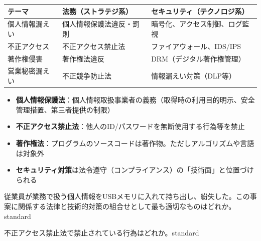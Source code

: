 \begin{comparison}
\begin{tabularx}{\textwidth}{lXX}
  \toprule
  \textbf{テーマ} & \textbf{法務（ストラテジ系）} & \textbf{セキュリティ（テクノロジ系）} \\
  \midrule
  個人情報漏えい & 個人情報保護法違反・罰則 & 暗号化、アクセス制御、ログ監視 \\
  不正アクセス & 不正アクセス禁止法 & ファイアウォール、IDS/IPS \\
  著作権侵害 & 著作権法違反 & DRM（デジタル著作権管理） \\
  営業秘密漏えい & 不正競争防止法 & 情報漏えい対策（DLP等） \\
  \bottomrule
\end{tabularx}
\end{comparison}

\begin{keypoint}
\begin{itemize}
  \item \textbf{個人情報保護法}：個人情報取扱事業者の義務（取得時の利用目的明示、安全管理措置、第三者提供の制限）
  \item \textbf{不正アクセス禁止法}：他人のID/パスワードを無断使用する行為等を禁止
  \item \textbf{著作権法}：プログラムのソースコードは著作物。ただしアルゴリズムや言語は対象外
  \item \textbf{セキュリティ対策}は法令遵守（コンプライアンス）の「技術面」と位置づけられる
\end{itemize}
\end{keypoint}


\begin{mondai}{従業員が業務で扱う個人情報をUSBメモリに入れて持ち出し、紛失した。この事案に関係する法律と技術的対策の組合せとして最も適切なものはどれか。}{standard}
\end{mondai}

\begin{mondai}{不正アクセス禁止法で禁止されている行為はどれか。}{standard}
\end{mondai}

